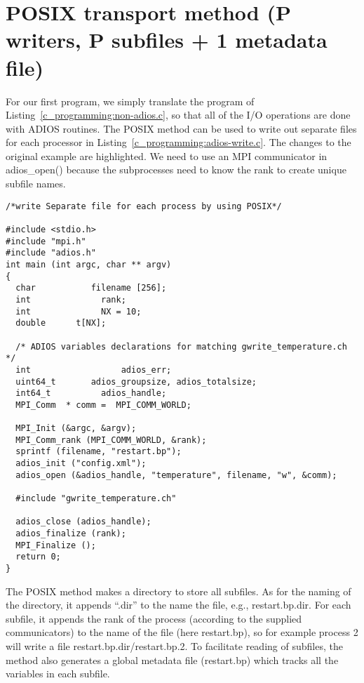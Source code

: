 \section{POSIX transport method (P writers, P subfiles + 1 metadata file)}

For our first program, we simply translate the program of
Listing~\ref{c_programming:non-adios.c}, so that all of the I/O operations
are done with ADIOS routines. The POSIX method can be used to write out
separate files for each processor in
Listing~\ref{c_programming:adios-write.c}. 
The changes to the original
example are highlighted. We need to use an MPI communicator in adios\_open()
because the subprocesses need to know the rank to create unique subfile
names.

\begin{lstlisting}[alsolanguage=C,caption=Example adios program to write P files from 
P processors (examples/C/manual/2\_adios\_write.c]
/*write Separate file for each process by using POSIX*/

#include <stdio.h>
#include "mpi.h"
#include "adios.h"
int main (int argc, char ** argv) 
{
  char           filename [256];
  int              rank;
  int              NX = 10;
  double      t[NX];

  /* ADIOS variables declarations for matching gwrite_temperature.ch */
  int                  adios_err;
  uint64_t       adios_groupsize, adios_totalsize;
  int64_t          adios_handle;
  MPI_Comm  * comm =  MPI_COMM_WORLD;

  MPI_Init (&argc, &argv);
  MPI_Comm_rank (MPI_COMM_WORLD, &rank);
  sprintf (filename, "restart.bp");
  adios_init ("config.xml");
  adios_open (&adios_handle, "temperature", filename, "w", &comm);

  #include "gwrite_temperature.ch"

  adios_close (adios_handle);
  adios_finalize (rank);
  MPI_Finalize ();
  return 0;
}
\end{lstlisting}\label{c_programming:adios-write.c}

The POSIX method makes a directory to store all subfiles. As for the naming of 
the directory, it appends ``.dir'' to the name the file, e.g., restart.bp.dir. 
For each subfile, it appends the rank of the process (according to the supplied 
communicators) to the name of the file (here restart.bp), so for example process 
2 will write a file restart.bp.dir/restart.bp.2. To facilitate reading of subfiles, 
the method also generates a global metadata file (restart.bp) which tracks all 
the variables in each subfile. 

